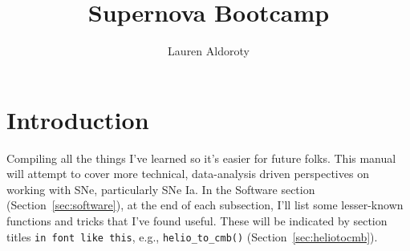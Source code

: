 \documentclass{ol-softwaremanual}
\title{Supernova Bootcamp}
\author{Lauren Aldoroty}
\begin{document}
\maketitle

\tableofcontents
\newpage

\section{Introduction}

Compiling all the things I've learned so it's easier for future folks. This manual will attempt to cover more technical, data-analysis driven perspectives on working with SNe, particularly SNe Ia. In the Software section (Section~\ref{sec:software}), at the end of each subsection, I'll list some lesser-known functions and tricks that I've found useful. These will be indicated by section titles \texttt{in font like this}, e.g., \texttt{helio\_to\_cmb()} (Section~\ref{sec:heliotocmb}).








\end{document}
